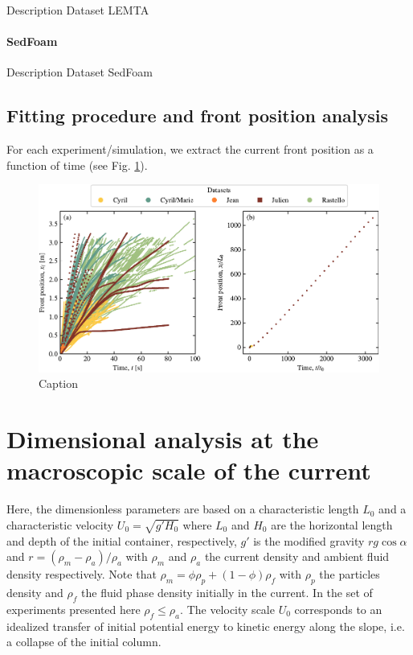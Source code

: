 \documentclass[twocolumn]{article}
\begin{document}
Description Dataset LEMTA

\paragraph{SedFoam}

Description Dataset SedFoam

\subsection{Fitting procedure and front position analysis}

For each experiment/simulation, we extract the current front position as a function of time (see Fig. \ref{fig:fig3}).



\begin{figure}
	\centering
	\includegraphics{figure3.pdf}
	\caption{Caption}
	\label{fig:fig3}
\end{figure}

\section{Dimensional analysis at the macroscopic scale of the current}
\label{sec:dimensionlessmap}

Here, the dimensionless parameters are based on a characteristic length $L_0$ and a characteristic velocity $U_0=\sqrt{g' H_0}$ where $L_0$ and $H_0$ are the horizontal length and depth of the initial container, respectively, $g'$ is the modified gravity $r g \cos{\alpha}$ and $r = (\rho_m - \rho_a)/\rho_a$ with $\rho_m$ and $\rho_a$ the current density and ambient fluid density respectively. Note that $\rho_m = \phi \rho_p+(1-\phi)\rho_f$ with $\rho_p$ the particles density and $\rho_f$ the fluid phase density initially in the current. In the set of experiments presented here $\rho_f\le \rho_a$. The velocity scale $U_0$ corresponds to an idealized transfer of initial potential energy to kinetic energy along the slope, i.e. a collapse of the initial column.
\end{document}
